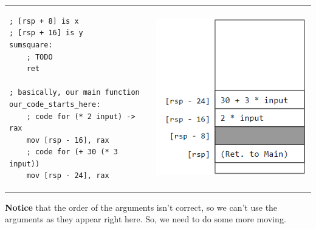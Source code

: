 \documentclass[letterpaper]{article}
\begin{document}
\begin{center}
    \begin{tabular}{p{3in}|p{3in}}
        \begin{verbatim}
; [rsp + 8] is x 
; [rsp + 16] is y
sumsquare:
    ; TODO 
    ret 

; basically, our main function 
our_code_starts_here:
    ; code for (* 2 input) -> rax 
    mov [rsp - 16], rax 
    ; code for (+ 30 (* 3 input))
    mov [rsp - 24], rax\end{verbatim}
        & \begin{center}
            \includegraphics[scale=0.7]{../assets/sumsq_arg_order1.png}
        \end{center}
    \end{tabular}
\end{center}

\textbf{Notice} that the order of the arguments isn't correct, so we can't use the arguments as they appear right here. So, we need to do some more moving.
\end{document}
